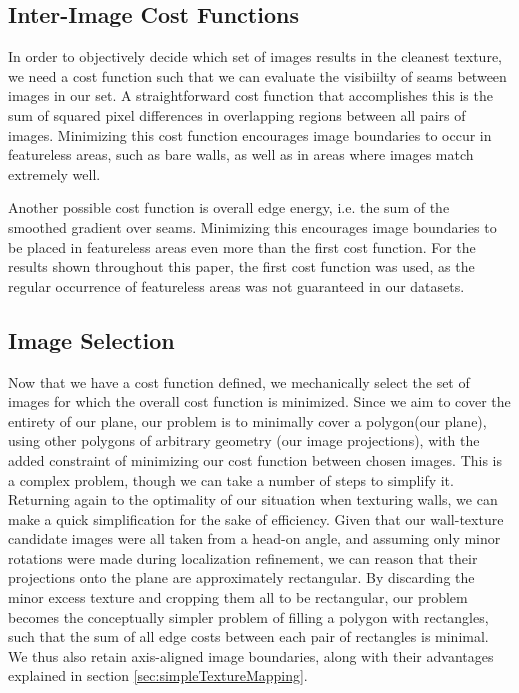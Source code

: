\documentclass[10pt,twocolumn,letterpaper]{article}
\begin{document}
\subsection{Inter-Image Cost Functions}
\label{sec:interImageCosts}
In order to objectively decide which set of images results in the
cleanest texture, we need a cost function such that we can evaluate
the visibiilty of seams between images in our set. A straightforward
cost function that accomplishes this is the sum of squared pixel
differences in overlapping regions between all pairs of
images. Minimizing this cost function encourages image boundaries to
occur in featureless areas, such as bare walls, as well as in areas
where images match extremely well.

Another possible cost function is overall edge energy, i.e. the sum of
the smoothed gradient over seams. Minimizing this encourages image
boundaries to be placed in featureless areas even more than the first
cost function. For the results shown throughout this paper, the first
cost function was used, as the regular occurrence of featureless areas
was not guaranteed in our datasets.

\subsection{Image Selection}
\label{sec:imageSelection}
Now that we have a cost function defined, we mechanically select the
set of images for which the overall cost function is minimized. Since
we aim to cover the entirety of our plane, our problem is to minimally
cover a polygon(our plane), using other polygons of arbitrary geometry
(our image projections), with the added constraint of minimizing our
cost function between chosen images. This is a complex problem, though
we can take a number of steps to simplify it. Returning again to the
optimality of our situation when texturing walls, we can make a quick
simplification for the sake of efficiency. Given that our wall-texture
candidate images were all taken from a head-on angle, and assuming
only minor rotations were made during localization refinement, we can
reason that their projections onto the plane are approximately
rectangular. By discarding the minor excess texture and cropping them
all to be rectangular, our problem becomes the conceptually simpler
problem of filling a polygon with rectangles, such that the sum of all
edge costs between each pair of rectangles is minimal. We thus also
retain axis-aligned image boundaries, along with their advantages
explained in section \ref{sec:simpleTextureMapping}.
\end{document}

